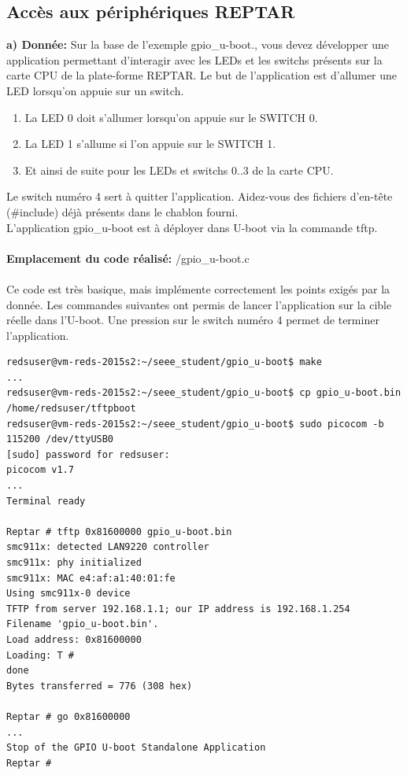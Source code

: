 \subsection{Accès aux périphériques REPTAR}
\textbf{a) Donnée: } Sur la base de l’exemple gpio\_u-boot., vous devez développer une application permettant d’interagir avec les
LEDs et les switchs présents sur la carte CPU de la plate-forme REPTAR.
Le but de l’application est d’allumer une LED lorsqu’on appuie sur un switch.
\begin{enumerate}
	\item La LED 0 doit s’allumer lorsqu’on appuie sur le SWITCH 0.
	\item La LED 1 s’allume si l’on appuie sur le SWITCH 1.
	\item Et ainsi de suite pour les LEDs et switchs 0..3 de la carte CPU.
\end{enumerate}
Le switch numéro 4 sert à quitter l’application. Aidez-vous des fichiers d'en-tête (\#include) déjà présents dans
le chablon fourni.\\
L’application gpio\_u-boot est à déployer dans U-boot via la commande tftp. \\\\
\textbf{Emplacement du code réalisé: }/gpio\_u-boot.c\\\\
Ce code est très basique, mais implémente correctement les points exigés par la donnée. Les commandes suivantes ont permis de lancer l'application sur la cible réelle dans l'U-boot. Une pression sur le switch numéro 4 permet de terminer l'application.\\
\begin{lstlisting}
redsuser@vm-reds-2015s2:~/seee_student/gpio_u-boot$ make
...
redsuser@vm-reds-2015s2:~/seee_student/gpio_u-boot$ cp gpio_u-boot.bin /home/redsuser/tftpboot
redsuser@vm-reds-2015s2:~/seee_student/gpio_u-boot$ sudo picocom -b 115200 /dev/ttyUSB0 
[sudo] password for redsuser: 
picocom v1.7
...
Terminal ready

Reptar # tftp 0x81600000 gpio_u-boot.bin
smc911x: detected LAN9220 controller
smc911x: phy initialized
smc911x: MAC e4:af:a1:40:01:fe
Using smc911x-0 device
TFTP from server 192.168.1.1; our IP address is 192.168.1.254
Filename 'gpio_u-boot.bin'.
Load address: 0x81600000
Loading: T #
done
Bytes transferred = 776 (308 hex)

Reptar # go 0x81600000
...
Stop of the GPIO U-boot Standalone Application
Reptar #
\end{lstlisting}